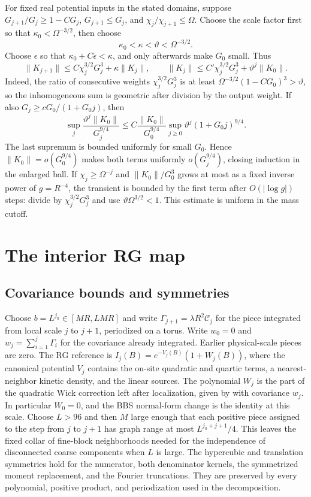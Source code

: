 \documentclass[11pt]{article}
\begin{document}
For fixed real potential inputs in the stated domains, suppose
\(G_{j+1}/G_j\ge1-CG_j\), \(G_{j+1}\le G_j\), and
\(\chi_j/\chi_{j+1}\le\Omega\).  Choose the scale factor first so
that \(\kappa_0<\Omega^{-3/2}\), then choose
\[
 \kappa_0<\kappa<\vartheta<\Omega^{-3/2}.
\]
Choose \(\epsilon\) so that \(\kappa_0+C\epsilon<\kappa\),
and only afterwards make \(G_0\) small.  Thus
\[
 \|K_{j+1}\|\le C\chi_j^{3/2}G_j^3+\kappa\|K_j\|,
 \qquad
 \|K_j\|\le C'\chi_j^{3/2}G_j^3+\vartheta^j\|K_0\|.
\]
Indeed, the ratio of consecutive weights \(\chi_j^{3/2}G_j^3\)
is at least \(\Omega^{-3/2}(1-CG_0)^3>\vartheta\), so the
inhomogeneous sum is geometric after division by the output weight.
If also \(G_j\ge cG_0/(1+G_0j)\), then
\[
 \sup_j\frac{\vartheta^j\|K_0\|}{G_j^{9/4}}
 \le C\frac{\|K_0\|}{G_0^{9/4}}
       \sup_{j\ge0}\vartheta^j(1+G_0j)^{9/4}.
\]
The last supremum is bounded uniformly for small \(G_0\).  Hence
\(\|K_0\|=o(G_0^{9/4})\) makes both terms uniformly
\(o(G_j^{9/4})\), closing induction in the enlarged ball.
If \(\chi_j\ge\Omega^{-j}\) and
\(\|K_0\|/G_0^3\) grows at most as a fixed inverse power of
\(g=R^{-4}\), the transient is bounded by the first term after
\(O(|\log g|)\) steps: divide by \(\chi_j^{3/2}G_j^3\)
and use \(\vartheta\Omega^{3/2}<1\).  This estimate is uniform
in the mass cutoff.


\section{The interior RG map}\label{sec:box-map}

\subsection{Covariance bounds and symmetries}

Choose \(b=L^{j_0}\in[MR,LMR]\) and write
\(\Gamma_{j+1}=\lambda R^2\mathscr C_j\) for the piece integrated
from local scale \(j\) to \(j+1\), periodized on a torus.
Write \(w_0=0\) and \(w_j=\sum_{i=1}^j\Gamma_i\) for the
covariance already integrated. Earlier physical-scale pieces are
zero. The RG reference is
\(I_j(B)=e^{-V_j(B)}(1+W_j(B))\), where the canonical
potential \(V_j\) contains the on-site quadratic and quartic terms,
a nearest-neighbor kinetic density, and the linear sources.
The polynomial \(W_j\) is the part of the quadratic Wick
correction left after localization, given by
\cite[(4.58)--(4.59)]{ParkMap} with covariance \(w_j\).
In particular \(W_0=0\), and the BBS normal-form change is
the identity at this scale. Choose \(L>96\) and then \(M\) large enough that each positive piece
assigned to the step from \(j\) to \(j+1\) has graph range at
most \(L^{j_0+j+1}/4\). This leaves the fixed collar of
fine-block neighborhoods needed for the independence of
disconnected coarse components when \(L\) is large. The
hypercubic and translation symmetries
hold for the numerator, both denominator kernels, the
symmetrized moment replacement, and the Fourier truncations.
They are preserved by every polynomial, positive product, and
periodization used in the decomposition.
\end{document}
